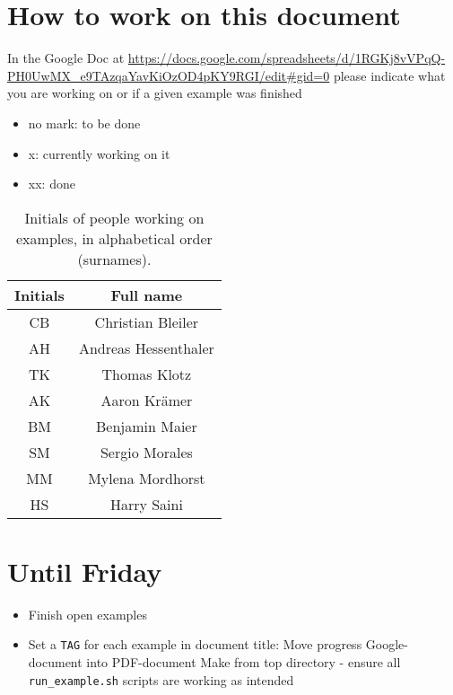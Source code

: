%
\section{How to work on this document}
%
In the Google Doc at
\url{https://docs.google.com/spreadsheets/d/1RGKj8vVPqQ-PH0UwMX_e9TAzqaYavKiOzOD4pKY9RGI/edit#gid=0}
please indicate what you are working on or if a given example was finished
%
\begin{itemize}
    \item{no mark: to be done}
    \item{x: currently working on it}
    \item{xx: done}
\end{itemize}
%
\begin{table}[h!]
    \centering
    \begin{tabular}{ c | c }
        Initials & Full name \\
        \midrule
        CB       & Christian Bleiler \\
        AH       & Andreas Hessenthaler \\
        TK       & Thomas Klotz \\
        AK       & Aaron Kr\"amer \\
        BM       & Benjamin Maier \\
        SM       & Sergio Morales \\
        MM       & Mylena Mordhorst \\
        HS       & Harry Saini \\
    \end{tabular}
    \caption{Initials of people working on examples, in alphabetical order (surnames).}
    \label{initials-tab}
\end{table}

\section{Until Friday}
%
\begin{itemize}
     \item{Finish open examples}
     \item{Set a \texttt{TAG} for each example in document title:}
		\subitem Move progress Google-document into PDF-document
		\subitem Make from top directory - ensure all \texttt{run\_example.sh} scripts are working as intended
\end{itemize}


